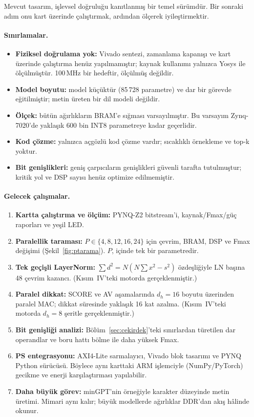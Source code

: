 Mevcut tasarım, işlevsel doğruluğu kanıtlanmış bir temel sürümdür. Bir sonraki adım onu kart üzerinde çalıştırmak, ardından ölçerek iyileştirmektir.

\paragraph{Sınırlamalar.}
\begin{itemize}
  \item \textbf{Fiziksel doğrulama yok:} Vivado sentezi, zamanlama kapanışı ve kart üzerinde çalıştırma henüz yapılmamıştır; kaynak kullanımı yalnızca Yosys ile ölçülmüştür. 100\,MHz bir hedeftir, ölçülmüş değildir.
  \item \textbf{Model boyutu:} model küçüktür (85\,728 parametre) ve dar bir görevde eğitilmiştir; metin üreten bir dil modeli değildir.
  \item \textbf{Ölçek:} bütün ağırlıkların BRAM'e sığması varsayılmıştır. Bu varsayım Zynq-7020'de yaklaşık 600 bin INT8 parametreye kadar geçerlidir.
  \item \textbf{Kod çözme:} yalnızca açgözlü kod çözme vardır; sıcaklıklı örnekleme ve top-k yoktur.
  \item \textbf{Bit genişlikleri:} geniş çarpıcıların genişlikleri güvenli tarafta tutulmuştur; kritik yol ve DSP sayısı henüz optimize edilmemiştir.
\end{itemize}

\paragraph{Gelecek çalışmalar.}
\begin{enumerate}
  \item \textbf{Kartta çalıştırma ve ölçüm:} PYNQ-Z2 bitstream'i, kaynak/Fmax/güç raporları ve yeşil LED.
  \item \textbf{Paralellik taraması:} $P \in \{4, 8, 12, 16, 24\}$ için çevrim, BRAM, DSP ve Fmax değişimi (Şekil~\ref{fig:ptarama}). $P$,  içinde tek bir parametredir.
  \item \textbf{Tek geçişli LayerNorm:} $\sum d^2 = N(N\sum x^2 - s^2)$ özdeşliğiyle LN başına 48 çevrim kazancı. (Kısım~IV'teki motorda gerçeklenmiştir.)
  \item \textbf{Paralel dikkat:} SCORE ve AV aşamalarında $d_h=16$ boyutu üzerinden paralel MAC; dikkat süresinde yaklaşık 16 kat azalma. (Kısım~IV'teki motorda $d_h=8$ şeritle gerçeklenmiştir.)
  \item \textbf{Bit genişliği analizi:} Bölüm~\ref{sec:cekirdek}'teki sınırlardan türetilen dar operandlar ve boru hattı bölme ile daha yüksek Fmax.
  \item \textbf{PS entegrasyonu:} AXI4-Lite sarmalayıcı, Vivado blok tasarımı ve PYNQ Python sürücüsü. Böylece aynı karttaki ARM işlemciyle (NumPy/PyTorch) gecikme ve enerji karşılaştırması yapılabilir.
  \item \textbf{Daha büyük görev:} minGPT'nin  örneğiyle karakter düzeyinde metin üretimi. Mimari aynı kalır; büyük modellerde ağırlıklar DDR'dan akış hâlinde okunur.
\end{enumerate}
